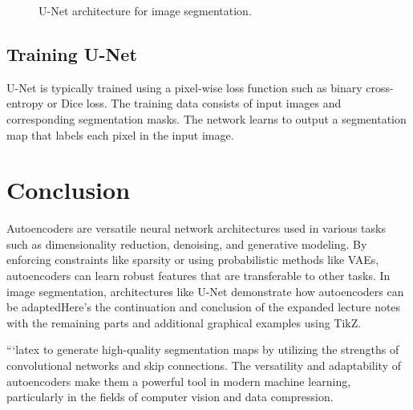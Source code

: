 \documentclass{article}
\begin{document}
\begin{figure}[h]
    \centering
    \caption{U-Net architecture for image segmentation.}
    \label{fig:unet}
\end{figure}

\subsection{Training U-Net}

U-Net is typically trained using a pixel-wise loss function such as binary cross-entropy or Dice loss. The training data consists of input images and corresponding segmentation masks. The network learns to output a segmentation map that labels each pixel in the input image.

\section{Conclusion}

Autoencoders are versatile neural network architectures used in various tasks such as dimensionality reduction, denoising, and generative modeling. By enforcing constraints like sparsity or using probabilistic methods like VAEs, autoencoders can learn robust features that are transferable to other tasks. In image segmentation, architectures like U-Net demonstrate how autoencoders can be adaptedHere's the continuation and conclusion of the expanded lecture notes with the remaining parts and additional graphical examples using TikZ.

```latex
    to generate high-quality segmentation maps by utilizing the strengths of convolutional networks and skip connections. The versatility and adaptability of autoencoders make them a powerful tool in modern machine learning, particularly in the fields of computer vision and data compression.
\end{document}
